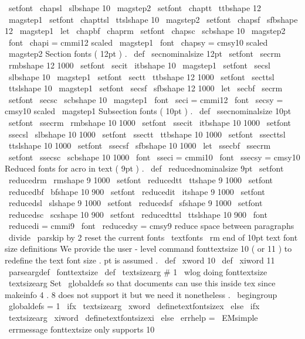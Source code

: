 {{{}
\
setfont
\
chapsl
\
slbshape
{
10
}
{
\
magstep2
}
\
setfont
\
chaptt
\
ttbshape
{
12
}
{
\
magstep1
}
\
setfont
\
chapttsl
\
ttslshape
{
10
}
{
\
magstep2
}
\
setfont
\
chapsf
\
sfbshape
{
12
}
{
\
magstep1
}
\
let
\
chapbf
\
chaprm
\
setfont
\
chapsc
\
scbshape
{
10
}
{
\
magstep2
}
\
font
\
chapi
=
cmmi12
scaled
\
magstep1
\
font
\
chapsy
=
cmsy10
scaled
\
magstep2
%
Section
fonts
(
12pt
)
.
\
def
\
secnominalsize
{
12pt
}
\
setfont
\
secrm
\
rmbshape
{
12
}
{
1000
}
\
setfont
\
secit
\
itbshape
{
10
}
{
\
magstep1
}
\
setfont
\
secsl
\
slbshape
{
10
}
{
\
magstep1
}
\
setfont
\
sectt
\
ttbshape
{
12
}
{
1000
}
\
setfont
\
secttsl
\
ttslshape
{
10
}
{
\
magstep1
}
\
setfont
\
secsf
\
sfbshape
{
12
}
{
1000
}
\
let
\
secbf
\
secrm
\
setfont
\
secsc
\
scbshape
{
10
}
{
\
magstep1
}
\
font
\
seci
=
cmmi12
\
font
\
secsy
=
cmsy10
scaled
\
magstep1
%
Subsection
fonts
(
10pt
)
.
\
def
\
ssecnominalsize
{
10pt
}
\
setfont
\
ssecrm
\
rmbshape
{
10
}
{
1000
}
\
setfont
\
ssecit
\
itbshape
{
10
}
{
1000
}
\
setfont
\
ssecsl
\
slbshape
{
10
}
{
1000
}
\
setfont
\
ssectt
\
ttbshape
{
10
}
{
1000
}
\
setfont
\
ssecttsl
\
ttslshape
{
10
}
{
1000
}
\
setfont
\
ssecsf
\
sfbshape
{
10
}
{
1000
}
\
let
\
ssecbf
\
ssecrm
\
setfont
\
ssecsc
\
scbshape
{
10
}
{
1000
}
\
font
\
sseci
=
cmmi10
\
font
\
ssecsy
=
cmsy10
%
Reduced
fonts
for
acro
in
text
(
9pt
)
.
\
def
\
reducednominalsize
{
9pt
}
\
setfont
\
reducedrm
\
rmshape
{
9
}
{
1000
}
\
setfont
\
reducedtt
\
ttshape
{
9
}
{
1000
}
\
setfont
\
reducedbf
\
bfshape
{
10
}
{
900
}
\
setfont
\
reducedit
\
itshape
{
9
}
{
1000
}
\
setfont
\
reducedsl
\
slshape
{
9
}
{
1000
}
\
setfont
\
reducedsf
\
sfshape
{
9
}
{
1000
}
\
setfont
\
reducedsc
\
scshape
{
10
}
{
900
}
\
setfont
\
reducedttsl
\
ttslshape
{
10
}
{
900
}
\
font
\
reducedi
=
cmmi9
\
font
\
reducedsy
=
cmsy9
%
reduce
space
between
paragraphs
\
divide
\
parskip
by
2
%
reset
the
current
fonts
\
textfonts
\
rm
}
%
end
of
10pt
text
font
size
definitions
%
We
provide
the
user
-
level
command
%
fonttextsize
10
%
(
or
11
)
to
redefine
the
text
font
size
.
pt
is
assumed
.
%
\
def
\
xword
{
10
}
\
def
\
xiword
{
11
}
%
\
parseargdef
\
fonttextsize
{
%
\
def
\
textsizearg
{
#
1
}
%
\
wlog
{
doing
fonttextsize
\
textsizearg
}
%
%
%
Set
\
globaldefs
so
that
documents
can
use
this
inside
tex
since
%
makeinfo
4
.
8
does
not
support
it
but
we
need
it
nonetheless
.
%
\
begingroup
\
globaldefs
=
1
\
ifx
\
textsizearg
\
xword
\
definetextfontsizex
\
else
\
ifx
\
textsizearg
\
xiword
\
definetextfontsizexi
\
else
\
errhelp
=
\
EMsimple
\
errmessage
{
fonttextsize
only
supports
10
}}}
